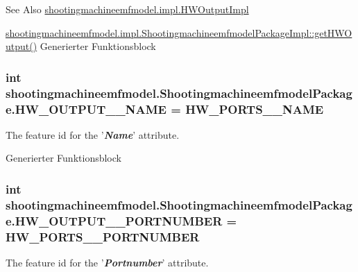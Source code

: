 \begin{DoxySeeAlso}{See Also}
\hyperlink{classshootingmachineemfmodel_1_1impl_1_1_h_w_output_impl}{shootingmachineemfmodel.\-impl.\-H\-W\-Output\-Impl} 

\hyperlink{classshootingmachineemfmodel_1_1impl_1_1_shootingmachineemfmodel_package_impl_ab435e9978a57a6482d01ba48fa8ca439}{shootingmachineemfmodel.\-impl.\-Shootingmachineemfmodel\-Package\-Impl\-::get\-H\-W\-Output()} Generierter Funktionsblock 
\end{DoxySeeAlso}
\hypertarget{interfaceshootingmachineemfmodel_1_1_shootingmachineemfmodel_package_a82c44c284e4ef61163abe3704089bfad}{
\subsubsection[{H\-W\-\_\-\-O\-U\-T\-P\-U\-T\-\_\-\-\_\-\-N\-A\-M\-E}]{\setlength{\rightskip}{0pt plus 5cm}int shootingmachineemfmodel.\-Shootingmachineemfmodel\-Package.\-H\-W\-\_\-\-O\-U\-T\-P\-U\-T\-\_\-\-\_\-\-N\-A\-M\-E = {\bf H\-W\-\_\-\-P\-O\-R\-T\-S\-\_\-\-\_\-\-N\-A\-M\-E}}}\label{interfaceshootingmachineemfmodel_1_1_shootingmachineemfmodel_package_a82c44c284e4ef61163abe3704089bfad}
The feature id for the '{\itshape {\bfseries Name}}' attribute.

Generierter Funktionsblock  \hypertarget{interfaceshootingmachineemfmodel_1_1_shootingmachineemfmodel_package_a2407c3a47af8c06cbb4aabb70268949d}{
\subsubsection[{H\-W\-\_\-\-O\-U\-T\-P\-U\-T\-\_\-\-\_\-\-P\-O\-R\-T\-N\-U\-M\-B\-E\-R}]{\setlength{\rightskip}{0pt plus 5cm}int shootingmachineemfmodel.\-Shootingmachineemfmodel\-Package.\-H\-W\-\_\-\-O\-U\-T\-P\-U\-T\-\_\-\-\_\-\-P\-O\-R\-T\-N\-U\-M\-B\-E\-R = {\bf H\-W\-\_\-\-P\-O\-R\-T\-S\-\_\-\-\_\-\-P\-O\-R\-T\-N\-U\-M\-B\-E\-R}}}\label{interfaceshootingmachineemfmodel_1_1_shootingmachineemfmodel_package_a2407c3a47af8c06cbb4aabb70268949d}
The feature id for the '{\itshape {\bfseries Portnumber}}' attribute.

